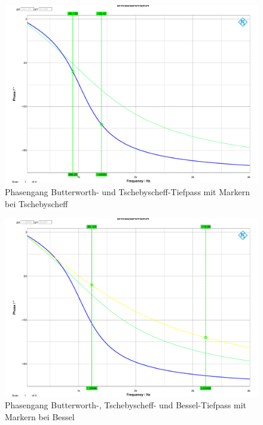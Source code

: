 \begin{figure}[h]
\centering
\includegraphics[width=0.65\linewidth]{Bilder/ImLabor/Phasengang_4_2_Tscheby_TP}
\caption{Phasengang Butterworth- und Tschebyscheff-Tiefpass mit Markern bei Tschebyscheff}
\label{fig:Phasengang_4_2_Tscheby_TP}
\end{figure}

\begin{figure}[h]
\centering
\includegraphics[width=0.65\linewidth]{Bilder/ImLabor/Phasengang_4_3_Bessel_TP_Alle}
\caption{Phasengang Butterworth-, Tschebyscheff- und Bessel-Tiefpass mit Markern bei Bessel}
\label{fig:Phasengang_4_3_Bessel_TP_Alle}
\end{figure}










